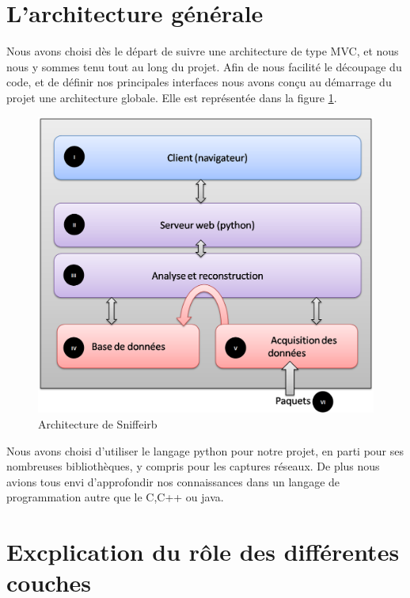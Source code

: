 

\section{L'architecture générale}

Nous avons choisi dès le départ de suivre une architecture de type MVC, et nous nous y sommes tenu tout au long du projet. Afin de nous facilité le découpage du code, et de définir nos principales interfaces nous
avons conçu au démarrage du projet une architecture globale. Elle est représentée dans la figure \ref{Architecture}. %

\begin{figure}[h!]
\centering
\includegraphics[scale=0.5]{Archi.png}
\caption{Architecture de Sniffeirb}
\label{Architecture}
\end{figure}

Nous avons choisi d'utiliser le langage python pour notre projet, en parti pour ses nombreuses bibliothèques, y compris pour les captures réseaux. De plus nous avions tous envi d'approfondir nos connaissances dans 
un langage de programmation autre que le C,C++ ou java.

\section{Excplication du rôle des différentes couches}

